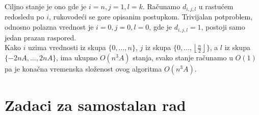 \documentclass[a4paper,12pt]{article}
\providecommand{\floor}[1]{\left \lfloor #1 \right \rfloor }
\numberwithin{equation}{subsection}
\begin{document}
Ciljno stanje je ono gde je $i=n, j=1, l=k$. Ra\v cunamo $d_{i,j,l}$ u rastu\' cem redosledu po $i$, rukovode\' ci se gore opisanim postupkom. Trivijalan potproblem, odnosno polazna vrednost je $i=0,j=0,l=0$, gde je $d_{i,j,l} = 1$, postoji samo jedan prazan raspored.
\\

Kako $i$ uzima vrednosti iz skupa $\{ 0, \ldots, n \}$, $j$ iz skupa $\{0, \ldots, \floor{\frac{n}{2}} \}$, a $l$ iz skupa $\{ -2nA, \ldots, 2nA \}$, ima ukupno $O(n^3 A)$ stanja, svako stanje ra\v cunamo u $O(1)$ pa je kona\v cna vremenska slo\v zenost ovog algoritma $O(n^3 A)$.

\section{Zadaci za samostalan rad}
\end{document}
